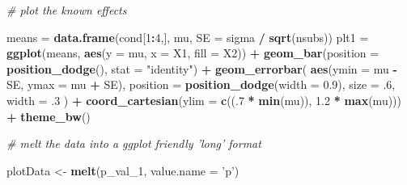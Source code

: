 \documentclass[]{book}
\newenvironment{Shaded}{\begin{snugshade}}{\end{snugshade}}
\newcommand{\CommentTok}[1]{\textcolor[rgb]{0.56,0.35,0.01}{\textit{#1}}}
\newcommand{\DataTypeTok}[1]{\textcolor[rgb]{0.13,0.29,0.53}{#1}}
\newcommand{\DecValTok}[1]{\textcolor[rgb]{0.00,0.00,0.81}{#1}}
\newcommand{\FloatTok}[1]{\textcolor[rgb]{0.00,0.00,0.81}{#1}}
\newcommand{\KeywordTok}[1]{\textcolor[rgb]{0.13,0.29,0.53}{\textbf{#1}}}
\newcommand{\NormalTok}[1]{#1}
\newcommand{\OperatorTok}[1]{\textcolor[rgb]{0.81,0.36,0.00}{\textbf{#1}}}
\newcommand{\StringTok}[1]{\textcolor[rgb]{0.31,0.60,0.02}{#1}}
\begin{document}
\begin{Shaded}
\begin{Highlighting}[]
\CommentTok{# plot the known effects}

 
\NormalTok{means =}\StringTok{ }\KeywordTok{data.frame}\NormalTok{(cond[}\DecValTok{1}\OperatorTok{:}\DecValTok{4}\NormalTok{,], mu, }\DataTypeTok{SE =}\NormalTok{ sigma }\OperatorTok{/}\StringTok{ }\KeywordTok{sqrt}\NormalTok{(nsubs))}
\NormalTok{plt1 =}\StringTok{ }\KeywordTok{ggplot}\NormalTok{(means, }\KeywordTok{aes}\NormalTok{(}\DataTypeTok{y =}\NormalTok{ mu, }\DataTypeTok{x =}\NormalTok{ X1, }\DataTypeTok{fill =}\NormalTok{ X2)) }\OperatorTok{+}
\KeywordTok{geom_bar}\NormalTok{(}\DataTypeTok{position =} \KeywordTok{position_dodge}\NormalTok{(), }\DataTypeTok{stat =} \StringTok{"identity"}\NormalTok{) }\OperatorTok{+}
\KeywordTok{geom_errorbar}\NormalTok{(}
\KeywordTok{aes}\NormalTok{(}\DataTypeTok{ymin =}\NormalTok{ mu }\OperatorTok{-}\StringTok{ }\NormalTok{SE, }\DataTypeTok{ymax =}\NormalTok{ mu }\OperatorTok{+}\StringTok{ }\NormalTok{SE),}
\DataTypeTok{position =} \KeywordTok{position_dodge}\NormalTok{(}\DataTypeTok{width =} \FloatTok{0.9}\NormalTok{),}
\DataTypeTok{size =} \FloatTok{.6}\NormalTok{,}
\DataTypeTok{width =} \FloatTok{.3}
\NormalTok{) }\OperatorTok{+}
\KeywordTok{coord_cartesian}\NormalTok{(}\DataTypeTok{ylim =} \KeywordTok{c}\NormalTok{((.}\DecValTok{7} \OperatorTok{*}\StringTok{ }\KeywordTok{min}\NormalTok{(mu)), }\FloatTok{1.2} \OperatorTok{*}\StringTok{ }\KeywordTok{max}\NormalTok{(mu))) }\OperatorTok{+}
\KeywordTok{theme_bw}\NormalTok{()}

\CommentTok{# melt the data into a ggplot friendly 'long' format}

\NormalTok{plotData <-}\StringTok{ }\KeywordTok{melt}\NormalTok{(p_val_}\DecValTok{1}\NormalTok{, }\DataTypeTok{value.name =} \StringTok{'p'}\NormalTok{)}


\end{Highlighting}
\end{Shaded}
\end{document}
